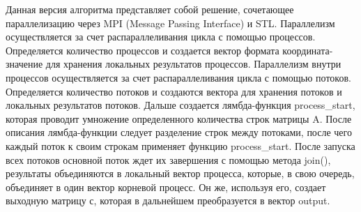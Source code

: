\documentclass[14pt,a4paper]{extarticle}
\begin{document}
Данная версия алгоритма представляет собой решение, сочетающее параллелизацию через MPI (Message Passing Interface) и STL. Параллелизм осуществляется за счет распараллеливания цикла с помощью процессов. Определяется количество процессов и создается вектор формата координата-значение для хранения локальных результатов процессов. Параллелизм внутри процессов осуществляется за счет распараллеливания цикла с помощью потоков. Определяется количество потоков и создаются вектора для хранения потоков и локальных результатов потоков. Дальше создается лямбда-функция process\_start, которая проводит умножение определенного количества строк матрицы A. После описания лямбда-функции следует разделение строк между потоками, после чего каждый поток к своим строкам применяет функцию process\_start. После запуска всех потоков основной поток ждет их завершения с помощью метода join(), результаты объединяются в локальный вектор процесса, которые, в свою очередь, объединяет в один вектор корневой процесс. Он же, используя его, создает выходную матрицу с, которая в дальнейшем преобразуется в вектор output.
\end{document}
